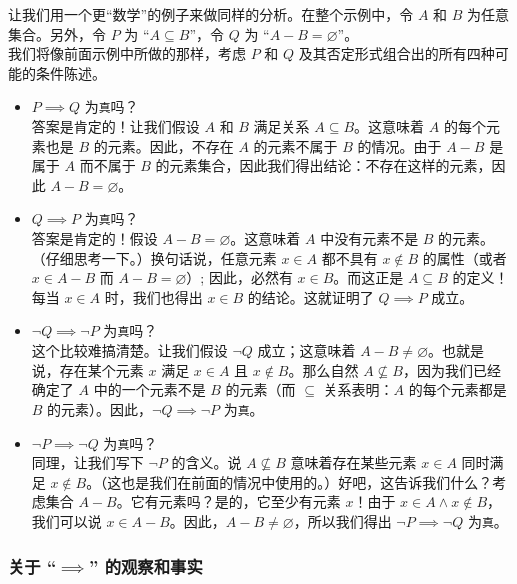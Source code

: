 \begin{example}
    让我们用一个更``数学''的例子来做同样的分析。在整个示例中，令 $A$ 和 $B$ 为任意集合。另外，令 $P$ 为 ``$A \subseteq B$''，令 $Q$ 为 ``$A - B = \varnothing$”。\\
    我们将像前面示例中所做的那样，考虑 $P$ 和 $Q$ 及其否定形式组合出的所有四种可能的条件陈述。
    \begin{itemize}
        \item $P \implies Q$ 为\verb|真|吗？\\
            答案是肯定的！让我们假设 $A$ 和 $B$ 满足关系 $A \subseteq B$。这意味着 $A$ 的每个元素也是 $B$ 的元素。因此，不存在 $A$ 的元素不属于 $B$ 的情况。由于 $A - B$ 是属于 $A$ 而不属于 $B$ 的元素集合，因此我们得出结论：不存在这样的元素，因此 $A - B = \varnothing$。
        \item $Q \implies P$ 为\verb|真|吗？\\
            答案是肯定的！假设 $A - B = \varnothing$。这意味着 $A$ 中没有元素不是 $B$ 的元素。（仔细思考一下。）换句话说，任意元素 $x \in A$ 都不具有 $x \notin B$ 的属性（或者 $x \in A - B$ 而 $A - B = \varnothing$）; 因此，必然有 $x \in B$。而这正是 $A \subseteq B$ 的定义！每当 $x \in A$ 时，我们也得出 $x \in B$ 的结论。这就证明了 $Q \implies P$ 成立。
        \item $\neg Q \implies \neg P$ 为\verb|真|吗？\\
            这个比较难搞清楚。让我们假设 $\neg Q$ 成立；这意味着 $A - B \ne \varnothing$。也就是说，存在某个元素 $x$ 满足 $x \in A$ 且 $x \notin B$。那么自然 $A \nsubseteq B$，因为我们已经确定了 $A$ 中的一个元素不是 $B$ 的元素（而 $\subseteq$ 关系表明：$A$ 的每个元素都是 $B$ 的元素）。因此，$\neg Q \implies \neg P$ 为\verb|真|。
        \item $\neg P \implies \neg Q$ 为\verb|真|吗？\\
            同理，让我们写下 $\neg P$ 的含义。说 $A \nsubseteq B$ 意味着存在某些元素 $x \in A$ 同时满足 $x \notin B$。（这也是我们在前面的情况中使用的。）好吧，这告诉我们什么？考虑集合 $A - B$。它有元素吗？是的，它至少有元素 $x$！由于 $x \in A \land x \notin B$，我们可以说 $x \in A - B$。因此，$A - B \ne \varnothing$，所以我们得出 $\neg P \implies \neg Q$ 为\verb|真|。
    \end{itemize}
\end{example}

\subsubsection*{关于 ``$\implies$'' 的观察和事实}

